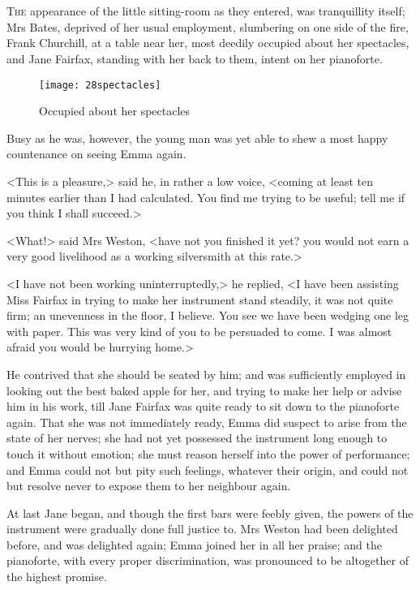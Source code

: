 \chapter[Chapter \thechapter]{}
\lettrine[lraise=0.3]{T}{he} appearance of the little sitting-room as they entered, was tranquillity itself; Mrs Bates, deprived of her usual employment, slumbering on one side of the fire, Frank Churchill, at a table near her, most deedily occupied about her spectacles, and Jane Fairfax, standing with her back to them, intent on her pianoforte.

\begin{figure}[tbph]
\centering
\texttt{[image: 28spectacles]}
\caption{Occupied about her spectacles}
\end{figure}

Busy as he was, however, the young man was yet able to shew a most happy countenance on seeing Emma again.

<This is a pleasure,> said he, in rather a low voice, <coming at least ten minutes earlier than I had calculated. You find me trying to be useful; tell me if you think I shall succeed.>

<What!> said Mrs Weston, <have not you finished it yet? you would not earn a very good livelihood as a working silversmith at this rate.>

<I have not been working uninterruptedly,> he replied, <I have been assisting Miss Fairfax in trying to make her instrument stand steadily, it was not quite firm; an unevenness in the floor, I believe. You see we have been wedging one leg with paper. This was very kind of you to be persuaded to come. I was almost afraid you would be hurrying home.>

He contrived that she should be seated by him; and was sufficiently employed in looking out the best baked apple for her, and trying to make her help or advise him in his work, till Jane Fairfax was quite ready to sit down to the pianoforte again. That she was not immediately ready, Emma did suspect to arise from the state of her nerves; she had not yet possessed the instrument long enough to touch it without emotion; she must reason herself into the power of performance; and Emma could not but pity such feelings, whatever their origin, and could not but resolve never to expose them to her neighbour again.

At last Jane began, and though the first bars were feebly given, the powers of the instrument were gradually done full justice to. Mrs Weston had been delighted before, and was delighted again; Emma joined her in all her praise; and the pianoforte, with every proper discrimination, was pronounced to be altogether of the highest promise.

